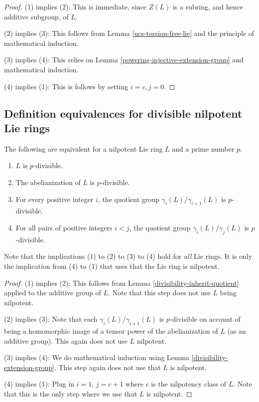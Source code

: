 \documentclass{ucetd}
\begin{document}
\begin{proof}
  (1) implies (2): This is immediate, since $Z(L)$ is a subring, and hence
  additive subgroup, of $L$.

  (2) implies (3): This follows from Lemma \ref{ucs-torsion-free-lie} and the
  principle of mathematical induction.

  (3) implies (4): This relies on Lemma
  \ref{powering-injective-extension-group} and mathematical induction.

  (4) implies (1): This is follows by setting $i = c, j = 0$.
\end{proof}

\subsection{Definition equivalences for divisible nilpotent Lie rings}

\begin{theorem}\label{divisibility-equivalence-theorem-lie}
  The following are equivalent for a nilpotent Lie ring $L$ and a prime
  number $p$.

  \begin{enumerate}
  \item $L$ is $p$-divisible.
  \item The abelianization of $L$ is $p$-divisible.
  \item For every positive integer $i$, the quotient group
    $\gamma_i(L)/\gamma_{i+1}(L)$ is $p$-divisible.
  \item For all pairs of positive integers $i < j$, the quotient group
    $\gamma_i(L)/\gamma_j(L)$ is $p$-divisible.
  \end{enumerate}

  Note that the implications (1) to (2) to (3) to (4) hold for {\em
    all} Lie rings. It is only the implication from (4) to (1) that
  uses that the Lie ring is nilpotent.
\end{theorem}

\begin{proof}
  (1) implies (2): This follows from Lemma
  \ref{divisibility-inherit-quotient} applied to the additive group of
  $L$. Note that this step does not use $L$ being nilpotent.

  (2) implies (3): Note that each $\gamma_i(L)/\gamma_{i+1}(L)$ is
  $p$-divisible on account of being a homomorphic image of a tensor
  power of the abelianization of $L$ (as an additive group). This
  again does not use $L$ nilpotent.

  (3) implies (4): We do mathematical induction using Lemma
  \ref{divisibility-extension-group}. This step again does not use
  that $L$ is nilpotent.

  (4) implies (1): Plug in $i = 1$, $j = c + 1$ where $c$ is the
  nilpotency class of $L$. Note that this is the only step where we
  use that $L$ is nilpotent.
\end{proof}
\end{document}
